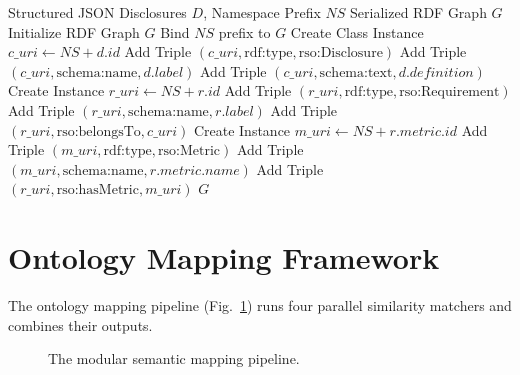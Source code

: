 \documentclass[journal,compsoc]{IEEEtran}
\begin{document}
\begin{algorithm}
\caption{Ontology Construction Pipeline}
\label{alg:ontbuild}
\begin{algorithmic}[1]
\REQUIRE Structured JSON Disclosures $D$, Namespace Prefix $NS$
\ENSURE Serialized RDF Graph $G$
\STATE Initialize RDF Graph $G$
\STATE Bind $NS$ prefix to $G$
    \STATE Create Class Instance $c\_uri \leftarrow NS + d.id$
    \STATE Add Triple $(c\_uri, \text{rdf:type}, \text{rso:Disclosure})$
    \STATE Add Triple $(c\_uri, \text{schema:name}, d.label)$
    \STATE Add Triple $(c\_uri, \text{schema:text}, d.definition)$
        \STATE Create Instance $r\_uri \leftarrow NS + r.id$
        \STATE Add Triple $(r\_uri, \text{rdf:type}, \text{rso:Requirement})$
        \STATE Add Triple $(r\_uri, \text{schema:name}, r.label)$
        \STATE Add Triple $(r\_uri, \text{rso:belongsTo}, c\_uri)$
            \STATE Create Instance $m\_uri \leftarrow NS + r.metric.id$
            \STATE Add Triple $(m\_uri, \text{rdf:type}, \text{rso:Metric})$
            \STATE Add Triple $(m\_uri, \text{schema:name}, r.metric.name)$
            \STATE Add Triple $(r\_uri, \text{rso:hasMetric}, m\_uri)$
        \ENDIF
    \ENDFOR
\ENDFOR
\RETURN $G$
\end{algorithmic}
\end{algorithm}

\section{Ontology Mapping Framework}
The ontology mapping pipeline (Fig.~\ref{fig:mapping}) runs four parallel similarity matchers and combines their outputs.

\begin{figure}[h]
\centering
{}
\caption{The modular semantic mapping pipeline.}
\label{fig:mapping}
\end{figure}
\end{document}
